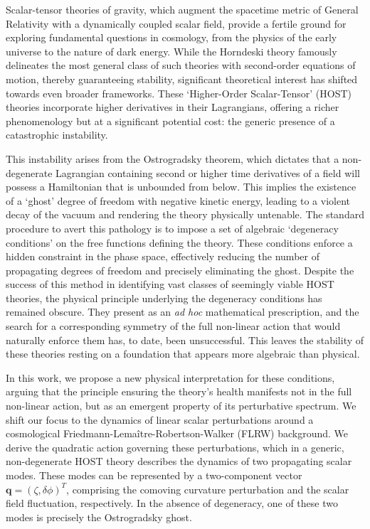 \documentclass[twocolumn]{aastex631}
\begin{document}
Scalar-tensor theories of gravity, which augment the spacetime metric of General Relativity with a dynamically coupled scalar field, provide a fertile ground for exploring fundamental questions in cosmology, from the physics of the early universe to the nature of dark energy. While the Horndeski theory famously delineates the most general class of such theories with second-order equations of motion, thereby guaranteeing stability, significant theoretical interest has shifted towards even broader frameworks. These `Higher-Order Scalar-Tensor' (HOST) theories incorporate higher derivatives in their Lagrangians, offering a richer phenomenology but at a significant potential cost: the generic presence of a catastrophic instability.

This instability arises from the Ostrogradsky theorem, which dictates that a non-degenerate Lagrangian containing second or higher time derivatives of a field will possess a Hamiltonian that is unbounded from below. This implies the existence of a `ghost' degree of freedom with negative kinetic energy, leading to a violent decay of the vacuum and rendering the theory physically untenable. The standard procedure to avert this pathology is to impose a set of algebraic `degeneracy conditions' on the free functions defining the theory. These conditions enforce a hidden constraint in the phase space, effectively reducing the number of propagating degrees of freedom and precisely eliminating the ghost. Despite the success of this method in identifying vast classes of seemingly viable HOST theories, the physical principle underlying the degeneracy conditions has remained obscure. They present as an \textit{ad hoc} mathematical prescription, and the search for a corresponding symmetry of the full non-linear action that would naturally enforce them has, to date, been unsuccessful. This leaves the stability of these theories resting on a foundation that appears more algebraic than physical.

In this work, we propose a new physical interpretation for these conditions, arguing that the principle ensuring the theory's health manifests not in the full non-linear action, but as an emergent property of its perturbative spectrum. We shift our focus to the dynamics of linear scalar perturbations around a cosmological Friedmann-Lema\^itre-Robertson-Walker (FLRW) background. We derive the quadratic action governing these perturbations, which in a generic, non-degenerate HOST theory describes the dynamics of two propagating scalar modes. These modes can be represented by a two-component vector $\mathbf{q} = (\zeta, \delta\phi)^T$, comprising the comoving curvature perturbation and the scalar field fluctuation, respectively. In the absence of degeneracy, one of these two modes is precisely the Ostrogradsky ghost.
\end{document}
